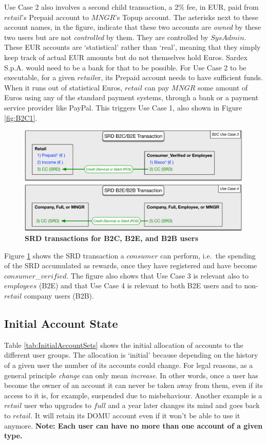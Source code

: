 Use Case 2 also involves a second child transaction, a 2\% fee, in EUR, paid from $retail$'s Prepaid account to $MNGR$'s Topup account. The asterisks next to these account names, in the figure, indicate that these two accounts are \emph{owned} by these two users but are not \emph{controlled} by them. They are controlled by $SysAdmin$. These EUR accounts are `statistical' rather than `real', meaning that they simply keep track of actual EUR amounts but do not themselves hold Euros. Sardex S.p.A. would need to be a bank for that to be possible. For Use Case 2 to be executable, for a given $retail$er, its Prepaid account needs to have sufficient funds. When it runs out of statistical Euros, $retail$ can pay $MNGR$ some amount of Euros using any of the standard payment systems, through a bank or a payment service provider like PayPal. This triggers Use Case 1, also shown in Figure \ref{fig:B2C1}.

\begin{figure}[h]
\centering
\includegraphics[width=15cm]{Figures/B2C2}
\caption{\small\textbf{SRD transactions for B2C, B2E, and B2B users}}
\label{fig:B2C2}
\end{figure}

Figure \ref{fig:B2C2} shows the SRD transaction a $consumer$ can perform, i.e.\ the spending of the SRD accumulated as rewards, once they have registered and have become $consumer$\_$verified$. The figure also shows that Use Case 3 is relevant also to $employees$ (B2E) and that Use Case 4 is relevant to both B2E users and to non-$retail$ company users (B2B).

\subsection{Initial Account State}
Table \ref{tab:InitialAccountSets} shows the initial allocation of accounts to the different user groups. The allocation is `initial' because  depending on the history of a given user the number of its accounts could change. For legal reasons, as a general principle \emph{change} can only mean \emph{increase}. In other words, once a user has become the owner of an account it can never be taken away from them, even if its access to it is, for example, suspended due to misbehaviour. Another example is a $retail$ user who upgrades to $full$ and a year later changes its mind and goes back to $retail$. It will retain its DOMU account even if it won't be able to use it anymore. {\bf Note: Each user can have no more than one account of a given type.}

